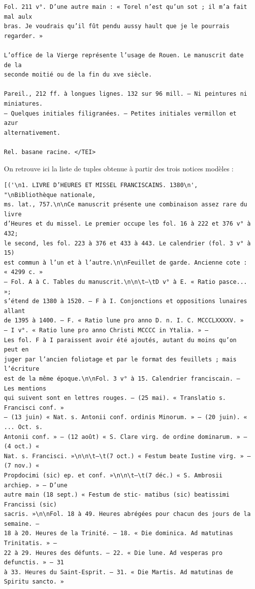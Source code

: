 \documentclass[a4paper,12pt,twoside]{book}
\begin{document}
\begin{verbatim}
Fol. 211 v°. D’une autre main : « Torel n’est qu’un sot ; il m’a fait mal aulx 
bras. Je voudrais qu’il fût pendu aussy hault que je le pourrais regarder. »

L’office de la Vierge représente l’usage de Rouen. Le manuscrit date de la
seconde moitié ou de la fin du xve siècle.

Pareil., 212 ff. à longues lignes. 132 sur 96 mill. — Ni peintures ni miniatures.
— Quelques initiales filigranées. — Petites initiales vermillon et azur 
alternativement.

Rel. basane racine. </TEI> 
	\end{verbatim}
	
On retrouve ici la liste de tuples obtenue à partir des trois notices modèles :

\begin{verbatim}
[('\n1. LIVRE D’HEURES ET MISSEL FRANCISCAINS. 1380\n', "\nBibliothèque nationale, 
ms. lat., 757.\n\nCe manuscrit présente une combinaison assez rare du livre 
d’Heures et du missel. Le premier occupe les fol. 16 à 222 et 376 v° à 432;
le second, les fol. 223 à 376 et 433 à 443. Le calendrier (fol. 3 v° à 15)
est commun à l’un et à l’autre.\n\nFeuillet de garde. Ancienne cote : « 4299 c. »
— Fol. A à C. Tables du manuscrit.\n\n\t—\tD v° à E. « Ratio pasce... »;
s’étend de 1380 à 1520. — F à I. Conjonctions et oppositions lunaires allant 
de 1395 à 1400. — F. « Ratio lune pro anno D. n. I. C. MCCCLXXXXV. »
— I v°. « Ratio lune pro anno Christi MCCCC in Ytalia. » —
Les fol. F à I paraissent avoir été ajoutés, autant du moins qu’on peut en
juger par l’ancien foliotage et par le format des feuillets ; mais l’écriture 
est de la même époque.\n\nFol. 3 v° à 15. Calendrier franciscain. — Les mentions
qui suivent sont en lettres rouges. — (25 mai). « Translatio s. Francisci conf. »
— (13 juin) « Nat. s. Antonii conf. ordinis Minorum. » — (20 juin). « ... Oct. s.
Antonii conf. » — (12 août) « S. Clare virg. de ordine dominarum. » — (4 oct.) « 
Nat. s. Francisci. »\n\n\t—\t(7 oct.) « Festum beate Iustine virg. » — (7 nov.) « 
Propdocimi (sic) ep. et conf. »\n\n\t—\t(7 déc.) « S. Ambrosii archiep. » — D’une
autre main (18 sept.) « Festum de stic- matibus (sic) beatissimi Francissi (sic) 
sacris. »\n\nFol. 18 à 49. Heures abrégées pour chacun des jours de la semaine. —
18 à 20. Heures de la Trinité. — 18. « Die dominica. Ad matutinas Trinitatis. » — 
22 à 29. Heures des défunts. — 22. « Die lune. Ad vesperas pro defunctis. » — 31 
à 33. Heures du Saint-Esprit. — 31. « Die Martis. Ad matutinas de Spiritu sancto. »

\end{verbatim}
\end{document}
